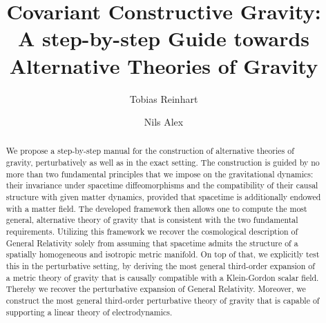 \documentclass[%
preprint,
titlepage,
nofootinbib,
amsmath,amssymb,
showkeys,
aps,
prd,
floatfix,
]{revtex4-2}
\begin{document}

\title{Covariant Constructive Gravity:\\
A step-by-step Guide towards Alternative Theories of Gravity}

\author{Tobias Reinhart}
\author{Nils Alex}


\begin{abstract}
We propose a step-by-step manual for the construction of alternative theories of gravity, perturbatively as well as in the exact setting. The construction is guided by no more than two fundamental principles that we impose on the gravitational dynamics: their invariance under spacetime diffeomorphisms and the compatibility of their causal structure with given matter dynamics, provided that spacetime is additionally endowed with a matter field. The developed framework then allows one to compute the most general, alternative theory of gravity that is consistent with the two fundamental requirements.
Utilizing this framework we recover the cosmological description of General Relativity solely from assuming that spacetime admits the structure of a spatially homogeneous and isotropic metric manifold.
On top of that, we explicitly test this in the perturbative setting, by deriving the most general third-order expansion of a metric theory of gravity that is causally compatible with a Klein-Gordon scalar field. Thereby we recover the perturbative expansion of General Relativity. Moreover, we construct the most general third-order perturbative theory of gravity that is capable of supporting a linear theory of electrodynamics.
\end{abstract}


\maketitle
\end{document}
